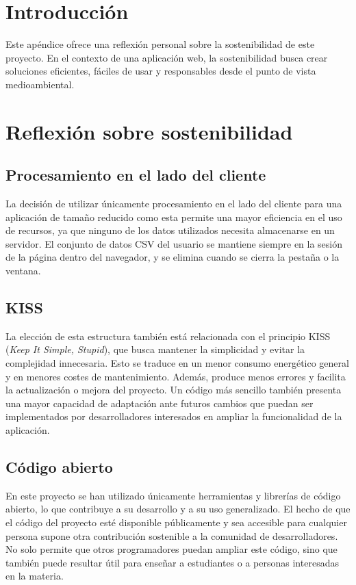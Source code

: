 
\section{Introducción}
Este apéndice ofrece una reflexión personal sobre la sostenibilidad de este proyecto. En el contexto de una aplicación web, la sostenibilidad busca crear soluciones eficientes, fáciles de usar y responsables desde el punto de vista medioambiental.

\section{Reflexión sobre sostenibilidad}

\subsection{Procesamiento en el lado del cliente}
La decisión de utilizar únicamente procesamiento en el lado del cliente para una aplicación de tamaño reducido como esta permite una mayor eficiencia en el uso de recursos, ya que ninguno de los datos utilizados necesita almacenarse en un servidor. El conjunto de datos CSV del usuario se mantiene siempre en la sesión de la página dentro del navegador, y se elimina cuando se cierra la pestaña o la ventana.

\subsection{KISS}
La elección de esta estructura también está relacionada con el principio KISS (\textit{Keep It Simple, Stupid}), que busca mantener la simplicidad y evitar la complejidad innecesaria. Esto se traduce en un menor consumo energético general y en menores costes de mantenimiento. Además, produce menos errores y facilita la actualización o mejora del proyecto. Un código más sencillo también presenta una mayor capacidad de adaptación ante futuros cambios que puedan ser implementados por desarrolladores interesados en ampliar la funcionalidad de la aplicación.

\subsection{Código abierto}
En este proyecto se han utilizado únicamente herramientas y librerías de código abierto, lo que contribuye a su desarrollo y a su uso generalizado. El hecho de que el código del proyecto esté disponible públicamente y sea accesible para cualquier persona supone otra contribución sostenible a la comunidad de desarrolladores. No solo permite que otros programadores puedan ampliar este código, sino que también puede resultar útil para enseñar a estudiantes o a personas interesadas en la materia.

